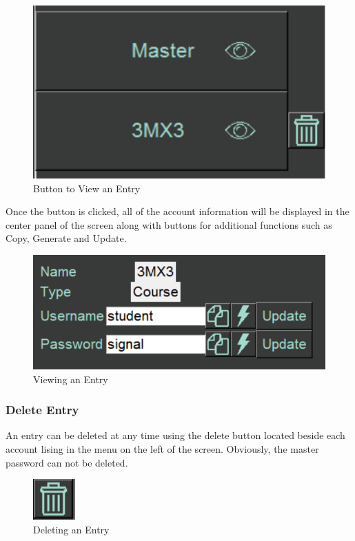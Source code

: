 \documentclass[12pt, titlepage]{article}
\begin{document}
\begin{figure}[h]
	\includegraphics[scale=0.3]{images/ViewEntry.png}
	\caption{Button to View an Entry}
	\label{fig:VieEnt1}
\end{figure}

Once the button is clicked, all of the account information will be displayed in the center panel of the screen along with buttons for additional functions such as Copy, Generate and Update. 

\begin{figure}[h]
	\includegraphics[scale=0.3]{images/UpdateEntry.png}
	\caption{Viewing an Entry}
	\label{fig:VieEnt2}
\end{figure}


\subsubsection{Delete Entry} \label{DelEnt}

An entry can be deleted at any time using the delete button located beside each account lising in the menu on the left of the screen. Obviously, the master password can not be deleted.

\begin{figure}[h]
	\includegraphics[scale=0.3]{images/DeleteEntry.png}
	\caption{Deleting an Entry}
	\label{fig:DeEnt}
\end{figure}
\end{document}
